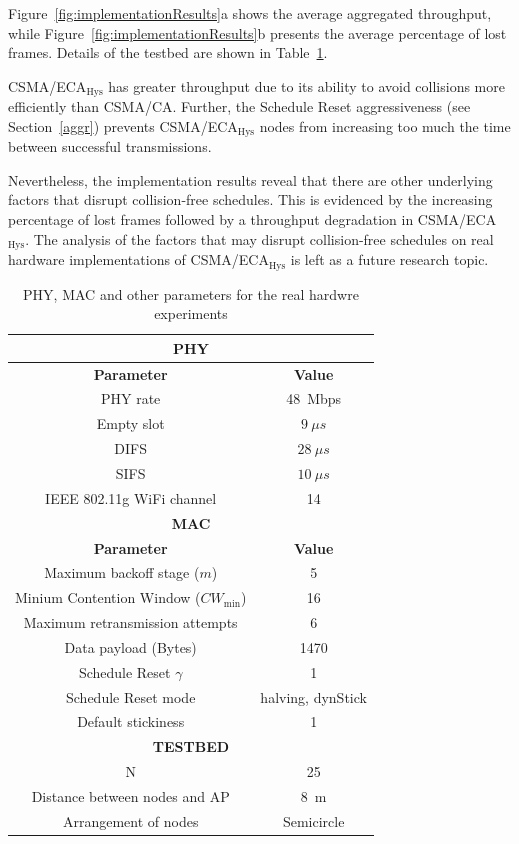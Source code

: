 Figure~\ref{fig:implementationResults}a shows the average aggregated throughput, while Figure~\ref{fig:implementationResults}b presents the average percentage of lost frames. Details of the testbed are shown in Table~\ref{tab:testbed}. 

CSMA/ECA$_{\text{Hys}}$ has greater throughput due to its ability to avoid collisions more efficiently than CSMA/CA. Further, the Schedule Reset aggressiveness (see Section~\ref{aggr}) prevents CSMA/ECA$_{\text{Hys}}$ nodes from increasing too much the time between successful transmissions. 

Nevertheless, the implementation results reveal that there are other underlying factors that disrupt collision-free schedules. This is evidenced by the increasing percentage of lost frames followed by a throughput degradation in CSMA/ECA$_{\text{Hys}}$. The analysis of the factors that may disrupt collision-free schedules on real hardware implementations of CSMA/ECA$_{\text{Hys}}$ is left as a future research topic.


	\begin{table}
		\centering
		\caption{PHY, MAC and other parameters for the real hardwre experiments}
		\label{tab:testbed}
		\begin{tabular}{|c|c|}
			\hline
			\multicolumn{2}{|c|}{{\bfseries PHY}}\\
			\hline
			{\bfseries Parameter} & {\bfseries Value}\\
			\hline
			PHY rate & 48~Mbps\\
			Empty slot & $9~\mu s$\\
			DIFS & $28~\mu s$\\
			SIFS & $10~\mu s$\\
			IEEE 802.11g WiFi channel & 14\\
			\hline
			\multicolumn{2}{|c|}{{\bfseries MAC}}\\
			\hline
			{\bfseries Parameter} & {\bfseries Value}\\
			\hline
			Maximum backoff stage ($m$) & 5\\
			Minium Contention Window ($CW_{\min}$) & 16\\
			Maximum retransmission attempts & 6\\
			Data payload (Bytes) & 1470\\
			Schedule Reset $\gamma$ & 1\\
			Schedule Reset mode & halving, dynStick\\
			Default stickiness & 1\\
			
			\hline
			\multicolumn{2}{|c|}{{\bfseries TESTBED}}\\
			\hline
			N & 25\\
			Distance between nodes and AP & 8~m\\
			Arrangement of nodes & Semicircle\\
			\hline
		\end{tabular}
	\end{table}


